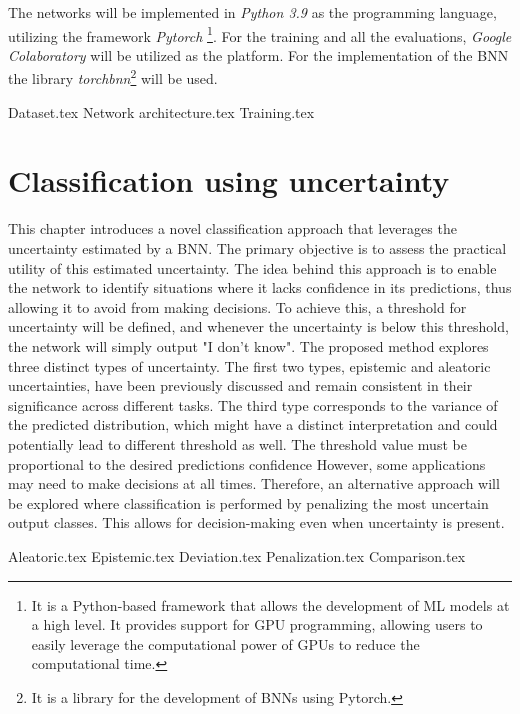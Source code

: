 \documentclass[
	a4paper,
	cleardoublepage=empty,
	headings=twolinechapter,
	numbers=autoenddot,
]{scrbook}
\begin{document}
	The networks will be implemented in \textit{Python 3.9} as the programming language, utilizing the framework \textit{Pytorch} \footnote{It is a Python-based framework that allows the development of ML models at a high level. It provides support for GPU programming, allowing users to easily leverage the computational power of GPUs to reduce the computational time.}\cite{NEURIPS2019_9015}. 
	For the training and all the evaluations, \textit{Google Colaboratory} will be utilized as the platform. For the implementation of the BNN the library \textit{torchbnn}\footnote{It is a library for the development of BNNs using Pytorch.}\cite{Torchbnn} will be used.
	
	{Dataset.tex}
	{Network architecture.tex}
	{Training.tex}
	
	\chapter{Classification using uncertainty}\label{chap:c3}
	
	This chapter introduces a novel classification approach that leverages the uncertainty estimated by a BNN. The primary objective is to assess the practical utility of this estimated uncertainty. The idea behind this approach is to enable the network to identify situations where it lacks confidence in its predictions, thus allowing it to avoid from making decisions. To achieve this, a threshold for uncertainty will be defined, and whenever the uncertainty is below this threshold, the network will simply output "I don't know". 
	The proposed method explores three distinct types of uncertainty. The first two types, epistemic and aleatoric uncertainties, have been previously discussed and remain consistent in their significance across different tasks. The third type corresponds to the variance of the predicted distribution, which might have a distinct interpretation and could potentially lead to different threshold as well. The threshold value must be proportional to the desired predictions confidence
	However, some applications may need to make decisions at all times. Therefore, an alternative approach will be explored where classification is performed by penalizing the most uncertain output classes. This allows for decision-making even when uncertainty is present.
	
	{Aleatoric.tex}
	{Epistemic.tex}
	{Deviation.tex}
	{Penalization.tex}
	{Comparison.tex}
	
\end{document}
